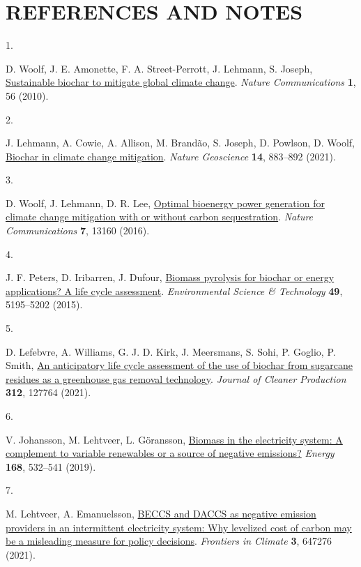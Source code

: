 \documentclass[
  letterpaper,
]{article}
\newlength{\cslhangindent}
\newlength{\csllabelwidth}
\newenvironment{CSLReferences}[2] %
 {\begin{list}{}{%
  \setlength{\itemindent}{0pt}
  \setlength{\leftmargin}{0pt}
  \setlength{\parsep}{0pt}
  \ifodd #1
   \setlength{\leftmargin}{\cslhangindent}
   \setlength{\itemindent}{-1\cslhangindent}
  \fi
  \setlength{\itemsep}{#2\baselineskip}}}
 {\end{list}}
\newcommand{\CSLLeftMargin}[1]{\parbox[t]{\csllabelwidth}{\strut#1\strut}}
\newcommand{\CSLRightInline}[1]{\parbox[t]{\linewidth - \csllabelwidth}{\strut#1\strut}}
\begin{document}
\section{REFERENCES AND NOTES}\label{references-and-notes}

\label{refs}
\begin{CSLReferences}{0}{1}
\CSLLeftMargin{1. }%
\CSLRightInline{D. Woolf, J. E. Amonette, F. A. Street-Perrott, J.
Lehmann, S. Joseph,
\href{https://doi.org/10.1038/ncomms1053}{Sustainable biochar to
mitigate global climate change}. \emph{Nature Communications}
\textbf{1}, 56 (2010).}

\CSLLeftMargin{2. }%
\CSLRightInline{J. Lehmann, A. Cowie, A. Allison, M. Brandão, S. Joseph,
D. Powlson, D. Woolf,
\href{https://doi.org/10.1038/s41561-021-00852-8}{Biochar in climate
change mitigation}. \emph{Nature Geoscience} \textbf{14}, 883--892
(2021).}

\CSLLeftMargin{3. }%
\CSLRightInline{D. Woolf, J. Lehmann, D. R. Lee,
\href{https://doi.org/10/f87kfp}{Optimal bioenergy power generation for
climate change mitigation with or without carbon sequestration}.
\emph{Nature Communications} \textbf{7}, 13160 (2016).}

\CSLLeftMargin{4. }%
\CSLRightInline{J. F. Peters, D. Iribarren, J. Dufour,
\href{https://doi.org/10.1021/es5060786}{Biomass pyrolysis for biochar
or energy applications? A life cycle assessment}. \emph{Environmental
Science \& Technology} \textbf{49}, 5195--5202 (2015).}

\CSLLeftMargin{5. }%
\CSLRightInline{D. Lefebvre, A. Williams, G. J. D. Kirk, J. Meersmans,
S. Sohi, P. Goglio, P. Smith,
\href{https://doi.org/10.1016/j.jclepro.2021.127764}{An anticipatory
life cycle assessment of the use of biochar from sugarcane residues as a
greenhouse gas removal technology}. \emph{Journal of Cleaner Production}
\textbf{312}, 127764 (2021).}

\CSLLeftMargin{6. }%
\CSLRightInline{V. Johansson, M. Lehtveer, L. Göransson,
\href{https://doi.org/10.1016/j.energy.2018.11.112}{Biomass in the
electricity system: A complement to variable renewables or a source of
negative emissions?} \emph{Energy} \textbf{168}, 532--541 (2019).}

\CSLLeftMargin{7. }%
\CSLRightInline{M. Lehtveer, A. Emanuelsson,
\href{https://doi.org/10.3389/fclim.2021.647276}{{BECCS} and {DACCS} as
negative emission providers in an intermittent electricity system: Why
levelized cost of carbon may be a misleading measure for policy
decisions}. \emph{Frontiers in Climate} \textbf{3}, 647276 (2021).}


\end{CSLReferences}
\end{document}
